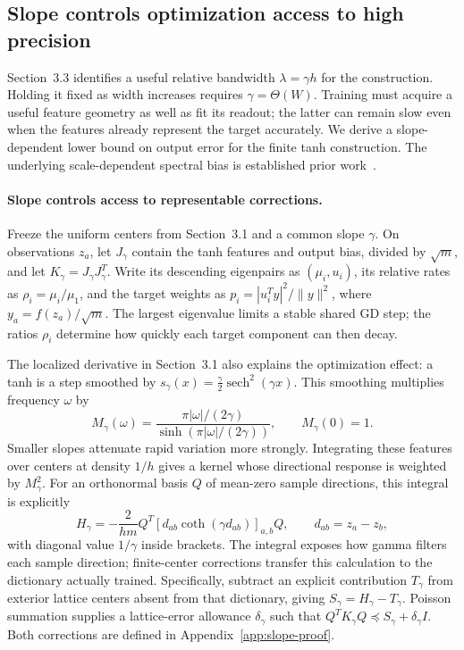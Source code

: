 \subsection{Slope controls optimization access to high precision}
\label{sec:slope-acquisition}

Section~3.3 identifies a useful relative bandwidth $\lambda=\gamma h$ for
the construction. Holding it fixed as width increases requires
$\gamma=\Theta(W)$. Training must acquire a useful feature geometry as well
as fit its readout; the latter can remain slow even when the features already
represent the target accurately. We derive a slope-dependent lower bound on
output error for the finite tanh construction. The underlying scale-dependent spectral bias is
established prior work~\citep{xu2020frequency,tancik2020fourier}.

\paragraph{Slope controls access to representable corrections.}
Freeze the uniform centers from Section~3.1 and a common slope $\gamma$.
On observations $z_a$, let $J_\gamma$ contain the tanh features and output bias,
divided by $\sqrt m$, and let $K_\gamma=J_\gamma J_\gamma^T$. Write its
descending eigenpairs as $(\mu_i,u_i)$, its relative rates as
$\rho_i=\mu_i/\mu_1$, and the target weights as
$p_i=|u_i^Ty|^2/\|y\|^2$, where $y_a=f(z_a)/\sqrt m$. The largest eigenvalue
limits a stable shared GD step; the ratios $\rho_i$ determine how quickly
each target component can then decay.

The localized derivative in Section~3.1 also explains the optimization effect:
a tanh is a step smoothed by
$s_\gamma(x)=\frac\gamma2\operatorname{sech}^2(\gamma x)$.
This smoothing multiplies frequency $\omega$ by
\begin{equation}
 M_\gamma(\omega)=\frac{\pi|\omega|/(2\gamma)}
 {\sinh(\pi|\omega|/(2\gamma))},\qquad M_\gamma(0)=1.
 \label{eq:slope-multiplier}
\end{equation}
Smaller slopes attenuate rapid variation more strongly. Integrating these
features over centers at density $1/h$ gives a kernel whose directional
response is weighted by $M_\gamma^2$. For an orthonormal basis $Q$ of
mean-zero sample directions, this integral is explicitly
\begin{equation}
 H_\gamma=-\frac2{hm}Q^T[d_{ab}\coth(\gamma d_{ab})]_{a,b}Q,
 \qquad d_{ab}=z_a-z_b,
 \label{eq:slope-explicit-kernel}
\end{equation}
with diagonal value $1/\gamma$ inside brackets. The integral exposes how
gamma filters each sample direction; finite-center corrections transfer this
calculation to the dictionary actually trained. Specifically, subtract an
explicit contribution $T_\gamma$ from exterior lattice centers absent from
that dictionary, giving $S_\gamma=H_\gamma-T_\gamma$. Poisson summation
supplies a lattice-error allowance $\delta_\gamma$ such that
$Q^TK_\gamma Q\preceq S_\gamma+\delta_\gamma I$.
Both corrections are defined in Appendix~\ref{app:slope-proof}.

